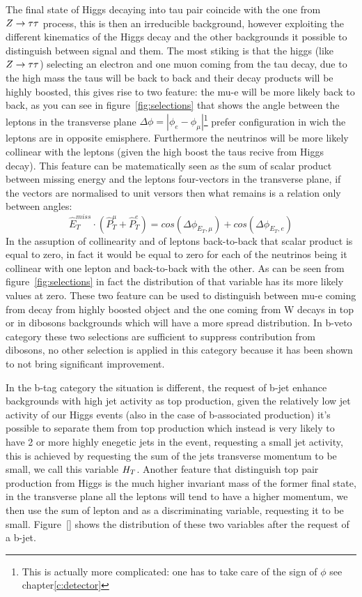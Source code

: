 The final state of Higgs decaying into tau pair coincide with the one from  $Z\rightarrow \tau\tau$  process, this is then an irreducible 
background, however exploiting the different kinematics of the Higgs decay and the other backgrounds it possible to distinguish 
between signal and them.
The most stiking is that the higgs (like $Z\rightarrow \tau\tau$) selecting an electron and one muon
coming from the tau decay, due to the high mass the taus will be back to back and their decay products will be highly boosted,
this gives rise to two feature: the mu-e will be more likely back to back, as you can see in figure~\ref{fig:selections} that shows the angle between the
leptons in the transverse plane 
$\Delta\phi = |\phi_{e} - \phi_{\mu}| $\footnote{This is actually more complicated: one has to take care of the sign of $\phi$ see chapter\ref{c:detector}}
prefer configuration in wich the leptons are in opposite emisphere.
Furthermore the neutrinos will be more likely collinear with the leptons (given the high boost the taus recive from Higgs decay).
This feature can be matematically seen as the sum of scalar product between missing energy and the leptons four-vectors in the
transverse plane, if the vectors are normalised to unit versors then what remains is a relation only between angles:
$$ \hat{E}_{T}^{miss} \cdot ( \hat{P}_{T}^{\mu} + \hat{P}_{T}^{e} ) = cos(\Delta\phi_{E_{T},\mu}) + cos(\Delta\phi_{E_{T},e})  $$
In the assuption of collinearity and of leptons back-to-back that scalar product  is equal to zero, in fact  it would be equal 
to zero for each of the  neutrinos being it collinear with one lepton and back-to-back with the other.
As can be seen from figure~\ref{fig:selections} in fact the distribution of that variable 
has its more likely values at zero. These two feature can be used to distinguish between mu-e coming from decay from highly 
boosted object and the one coming from W decays in top or in dibosons backgrounds which will have a more spread distribution.
In b-veto category these two selections are sufficient to suppress contribution from dibosons,
no other selection is applied in this category because it has been shown to not bring significant improvement.

In the b-tag category the situation is different, 
the  request of b-jet enhance backgrounds with high jet activity as top production, given the relatively low
jet activity of our Higgs events (also in the case of b-associated production) it's possible to separate them from
top production which instead is very likely to have 2 or more highly enegetic jets in the event, requesting a small jet activity, 
this is achieved by requesting the sum of the jets transverse momentum to be small, we call this variable $H_{T}$.
Another feature that distinguish top pair production from Higgs is the much higher invariant mass of the former final state,
in the transverse plane all the leptons will tend to have a higher momentum, we then use the sum of lepton \pt and \met as
a discriminating variable, requesting it to be small. Figure~\ref{} shows the distribution of these two variables 
after the request of a b-jet.

